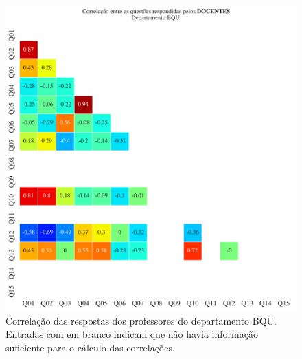 \documentclass[a4paper,10pt]{article}
\begin{document}
\begin{figure}[h]
\centering
\includegraphics[width=0.999\linewidth]{matriz_corr__BQU_docentes.png}
\caption{\label{fig:corr_docentes}Correlação das respostas dos professores do departamento BQU. Entradas com em branco indicam que não havia informação suficiente para o cálculo das correlações.}
\end{figure}
\end{document}
